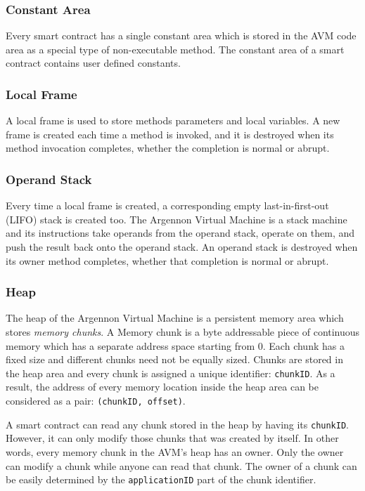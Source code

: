 \subsubsection{Constant Area}

Every smart contract has a single constant area which is stored in the AVM code area as a special type of
non-executable method. The constant area of a smart contract contains user
defined constants.



\subsubsection{Local Frame}

A local frame is used to store methods parameters and local variables. A new frame is created each time a method
is invoked, and it is destroyed when its method invocation completes, whether the completion is normal or abrupt.

\subsubsection{Operand Stack}

Every time a local frame is created, a corresponding empty last-in-first-out (LIFO) stack is created too. The
Argennon Virtual Machine is a stack machine and its instructions take operands from the operand stack, operate on
them, and push the result back onto the operand stack. An operand stack is destroyed when its owner method
completes, whether that completion is normal or abrupt.

\subsubsection{Heap}

The heap of the Argennon Virtual Machine is a persistent memory area which stores \emph{memory chunks}. A Memory
chunk is a byte addressable piece of continuous memory which has a separate address space starting from 0. Each chunk
has a fixed size and different chunks need not be equally sized. Chunks are stored in the heap area and every chunk is
assigned a unique identifier: \texttt{chunkID}. As a result, the address of every memory location inside
the heap area can be considered as a pair: \texttt{(chunkID, offset)}.

A smart contract can read any chunk stored in the heap by having its \texttt{chunkID}. However, it can only modify
those chunks that was created by itself. In other words, every memory chunk in the AVM's heap has an owner. Only
the owner can modify a chunk while anyone can read that chunk. The owner of a chunk can be easily determined
by the \texttt{applicationID} part of the chunk identifier.

